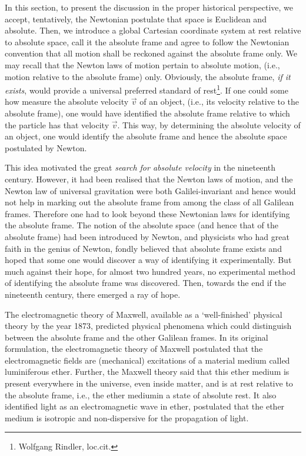 In this section, to present the discussion in the proper 
historical perspective, we accept, tentatively, the 
Newtonian postulate that space is Euclidean and absolute. 
Then,  we introduce a global Cartesian coordinate system  
at rest relative to  absolute space, call it the absolute 
frame  and agree to follow the 
Newtonian convention that all motion shall be reckoned 
against the absolute frame only.  We may recall that the 
Newton laws of motion pertain to {absolute motion}, (i.e., 
motion relative to the absolute frame) only. Obviously, the 
absolute frame, \textsl{if it exists}, would provide a  
universal preferred standard of rest\footnote{Wolfgang  
Rindler, loc.cit.}. If one could some how measure the 
absolute velocity  $\vec{v}$ of 
an object, (i.e., its velocity relative to the absolute 
frame), one would have identified the absolute frame 
relative to which the particle has that velocity $\vec{v}$. 
This way, by determining the absolute velocity of an object, 
one would identify the absolute frame and hence the  
absolute space postulated by Newton.

This idea motivated the great \textsl{search for 
absolute velocity}  in 
the nineteenth century. However, it had been  realised 
that the Newton laws of motion, and the Newton law of 
universal gravitation were both Galilei-invariant and hence 
would  not help in marking out the absolute frame 
from among the class of all Gali\-lean frames. Therefore one 
had to look beyond these  Newtonian laws for identifying 
the absolute frame. The notion of the absolute space (and 
hence that of the absolute frame) had been introduced by 
Newton, and physicists who had great faith in the genius of 
Newton, fondly believed that absolute frame exists and hoped 
that some one would discover a way of identifying it 
experimentally. But much against their hope, for almost two 
hundred years, no experimental method of identifying the 
absolute frame was discovered. Then, towards the end if the 
nineteenth century, there emerged a ray of hope.

The electromagnetic theory of Maxwell, available as a 
`well-finished' physical theory by the year 1873, predicted 
physical phenomena which could distinguish between the 
absolute frame and the other Galilean frames. In its 
original formulation, the electromagnetic theory of Maxwell 
postulated that the electromagnetic fields are (mechanical) 
excitations of a material medium called {luminiferous 
ether}. Further, the Maxwell 
theory said that this ether medium  is present everywhere in 
the universe, even inside matter, and is at rest relative to 
the absolute frame, i.e., the ether mediumin a state of 
absolute rest. It also 
identified light as an electromagnetic wave in ether, 
postulated that the ether medium is isotropic and 
non-dispersive for the propagation of light. 


